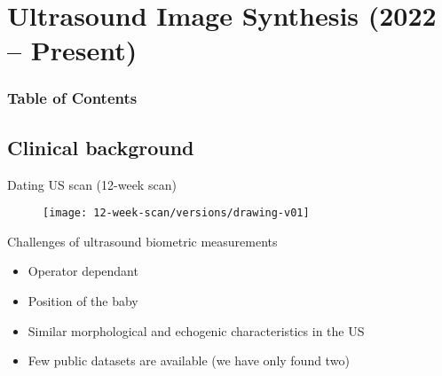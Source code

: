 
\section{Ultrasound Image Synthesis (2022 -- Present)}

\begin{frame}
  \frametitle{Table of Contents}
  \tableofcontents[currentsection]
\end{frame}




\subsection{Clinical background}

{

\begin{frame}{Dating US scan (12-week scan)}
      \begin{figure}
        \centering
        \texttt{[image: 12-week-scan/versions/drawing-v01]}
      \end{figure}
\end{frame}
}



{
\begin{frame}{Challenges of ultrasound biometric measurements}	

\begin{itemize}
\item Operator dependant 
\item Position of the baby
\item Similar morphological and echogenic characteristics in the US
\item Few public datasets are available (we have only found two)
\end{itemize}

\end{frame}
}




